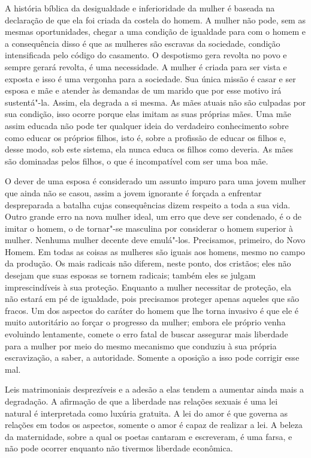 A história bíblica da desigualdade e inferioridade da mulher é baseada
na declaração de que ela foi criada da costela do homem. A mulher não
pode, sem as mesmas oportunidades, chegar a uma condição de igualdade
para com o homem e a consequência disso é que as mulheres são escravas
da sociedade, condição intensificada pelo código do casamento. O
despotismo gera revolta no povo e sempre gerará revolta, é uma
necessidade. A mulher é criada para ser vista e exposta e isso é uma
vergonha para a sociedade. Sua única missão é casar e ser esposa e mãe e
atender às demandas de um marido que por esse motivo irá sustentá"-la.
Assim, ela degrada a si mesma. As mães atuais não são culpadas por
sua condição, isso ocorre porque elas imitam as suas próprias mães. Uma
mãe assim educada não pode ter qualquer ideia do verdadeiro conhecimento
sobre como educar os próprios filhos, isto é, sobre a profissão de
educar os filhos e, desse modo, sob este sistema, ela nunca educa os
filhos como deveria. As mães são dominadas pelos filhos, o que é
incompatível com ser uma boa mãe.

O dever de uma esposa é considerado um assunto impuro para uma jovem
mulher que ainda não se casou, assim a jovem ignorante é forçada a
enfrentar despreparada a batalha cujas consequências dizem respeito a toda a sua vida.
Outro grande erro na nova mulher ideal, um erro que deve ser condenado,
é o de imitar o homem, o de tornar"-se masculina por considerar o homem
superior à mulher. Nenhuma mulher decente deve emulá"-los. Precisamos,
primeiro, do Novo Homem. Em todas as coisas as mulheres são iguais aos
homens, mesmo no campo da produção. Os mais radicais não diferem, neste
ponto, dos cristãos; eles não desejam que suas esposas se tornem
radicais; também eles se julgam imprescindíveis à sua proteção. Enquanto
a mulher necessitar de proteção, ela não estará em pé de igualdade, pois
precisamos proteger apenas aqueles que são fracos. Um dos aspectos do
caráter do homem que lhe torna invasivo é que ele é muito autoritário
ao forçar o progresso da mulher; embora ele próprio venha
evoluindo lentamente, comete o erro fatal de buscar assegurar mais
liberdade para a mulher por meio do mesmo mecanismo que conduziu à sua própria
escravização, a saber, a autoridade. Somente a oposição a isso pode
corrigir esse mal.

Leis matrimoniais desprezíveis e a adesão a elas tendem a aumentar ainda
mais a degradação. A afirmação de que a liberdade nas relações sexuais é
uma lei natural é interpretada como luxúria gratuita. A lei do amor é
que governa as relações em todos os aspectos, somente o amor é capaz de
realizar a lei. A beleza da maternidade, sobre a qual os poetas cantaram
e escreveram, é uma farsa, e não pode ocorrer enquanto não tivermos
liberdade econômica.

